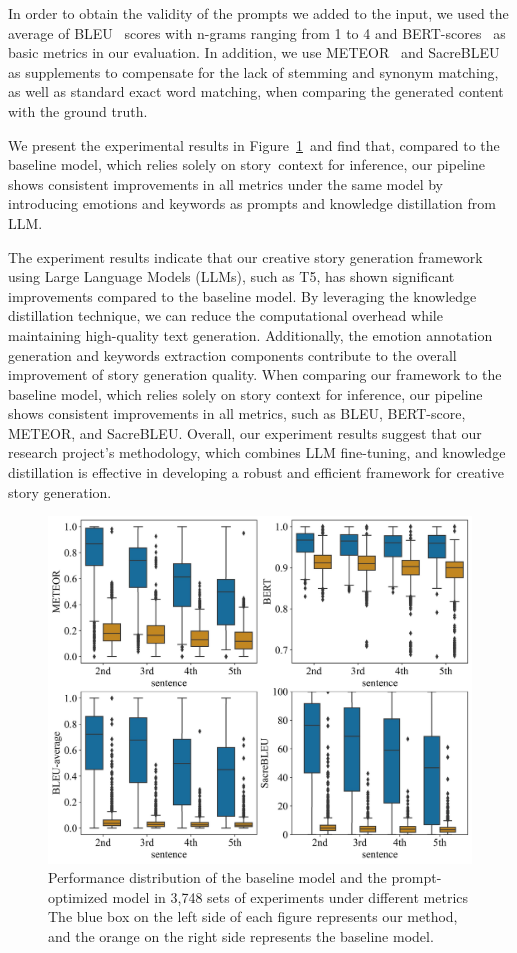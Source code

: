 \documentclass{article} %
\begin{document}
In order to obtain the validity of the prompts we added to the input, we used the average of BLEU~\cite{lin-och-2004-orange} scores with n-grams ranging from 1 to 4 and BERT-scores~\cite{https://doi.org/10.48550/arxiv.1904.09675} as basic metrics in our evaluation. In addition, we use METEOR~\cite{banarjee2005} and SacreBLEU\cite{post-2018-call} as supplements to compensate for the lack of stemming and synonym matching, as well as standard exact word matching, when comparing the generated content with the ground truth.

We present the experimental results in Figure~\ref{metricCompare-baseline} and find that, compared to the baseline model, which relies solely on story context for inference, our pipeline shows consistent improvements in all metrics under the same model by introducing emotions and keywords as prompts and knowledge distillation from LLM.

The experiment results indicate that our creative story generation framework using Large Language Models (LLMs), such as T5, has shown significant improvements compared to the baseline model. By leveraging the knowledge distillation technique, we can reduce the computational overhead while maintaining high-quality text generation. Additionally, the emotion annotation generation and keywords extraction components contribute to the overall improvement of story generation quality. When comparing our framework to the baseline model, which relies solely on story context for inference, our pipeline shows consistent improvements in all metrics, such as BLEU, BERT-score, METEOR, and SacreBLEU. Overall, our experiment results suggest that our research project's methodology, which combines LLM fine-tuning, and knowledge distillation is effective in developing a robust and efficient framework for creative story generation.

\begin{figure}[h]
    \centering
    \includegraphics[width = 0.6\linewidth]{figure/RESULT_1.jpg}
    \caption{Performance distribution of the baseline model and the prompt-optimized model in 3,748 sets of experiments under different metrics The blue box on the left side of each figure represents our method, and the orange on the right side represents the baseline model.}
    \label{metricCompare-baseline}
\end{figure}
\end{document}
